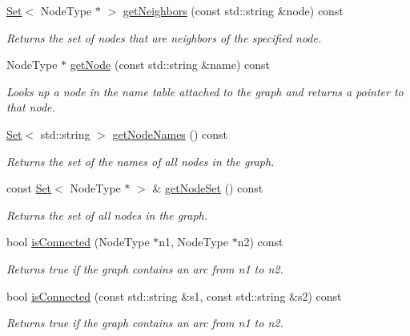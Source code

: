 \begin{DoxyCompactItemize}
\mbox{\hyperlink{classSet}{Set}}$<$ Node\+Type $\ast$ $>$ \mbox{\hyperlink{classGraph_a3a3720906c380f36b50530419330bfe5}{get\+Neighbors}} (const std\+::string \&node) const
\begin{DoxyCompactList}\small\item\em Returns the set of nodes that are neighbors of the specified node. \end{DoxyCompactList}\item 
Node\+Type $\ast$ \mbox{\hyperlink{classGraph_a81487976cf0e576047333c85463c33aa}{get\+Node}} (const std\+::string \&name) const
\begin{DoxyCompactList}\small\item\em Looks up a node in the name table attached to the graph and returns a pointer to that node. \end{DoxyCompactList}\item 
\mbox{\hyperlink{classSet}{Set}}$<$ std\+::string $>$ \mbox{\hyperlink{classGraph_a3c6f37932f377dd2bf4fec61343a916d}{get\+Node\+Names}} () const
\begin{DoxyCompactList}\small\item\em Returns the set of the names of all nodes in the graph. \end{DoxyCompactList}\item 
const \mbox{\hyperlink{classSet}{Set}}$<$ Node\+Type $\ast$ $>$ \& \mbox{\hyperlink{classGraph_abd5552888f57aaa581099e8146c617c9}{get\+Node\+Set}} () const
\begin{DoxyCompactList}\small\item\em Returns the set of all nodes in the graph. \end{DoxyCompactList}\item 
bool \mbox{\hyperlink{classGraph_a54164ab847f3a5c7fe15d15ac95af443}{is\+Connected}} (Node\+Type $\ast$n1, Node\+Type $\ast$n2) const
\begin{DoxyCompactList}\small\item\em Returns {\ttfamily true} if the graph contains an arc from {\ttfamily n1} to {\ttfamily n2}. \end{DoxyCompactList}\item 
bool \mbox{\hyperlink{classGraph_a3623b7decbedc522041c2c39d3b14421}{is\+Connected}} (const std\+::string \&s1, const std\+::string \&s2) const
\begin{DoxyCompactList}\small\item\em Returns {\ttfamily true} if the graph contains an arc from {\ttfamily n1} to {\ttfamily n2}. \end{DoxyCompactList}\item 

\end{DoxyCompactItemize}
